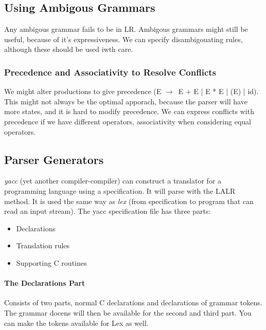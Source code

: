 \documentclass{article}
\newcommand{\ta}{$\to$~}
\begin{document}
\subsection{Using Ambigous Grammars} %
\label{sub:Using Ambigous Grammars}
Any ambigous grammar fails to be in LR. Ambigous grammars might still be useful, because of it's expressiveness. We can specify disambigouating rules, although these should be used iwth care.

\subsubsection{Precedence and Associativity to Resolve Conflicts} %
\label{ssub:Precedence an dAssociativity to Resolve Conflicts}
We might alter productions to give precedence (E \ta E + E | E * E | (E) | id). This might not always be the optimal apporach, because the parser will have more states, and it is hard to modify precedence. We can express conflicts with precedence if we have different operators, associativity when considering equal operators.

\subsection{Parser Generators} %
\label{sub:Parser Generators}
\emph{yacc} (yet another compiler-compiler) can construct a translator for a programming language using a specification. It will parse with the LALR method. It is used the same way as \emph{lex} (from specification to program that can read an input stream). The yacc specification file has three parts:
\begin{itemize}
	\item Declarations
	\item Translation rules
	\item Supporting C routines
\end{itemize}

\paragraph{The Declarations Part} %
\label{par:The Declarations Part}
Consists of two parts, normal C declarations and declarations of grammar tokens. The grammar docens will then be available for the second and third part. You can make the tokens available for Lex as well.
\end{document}
